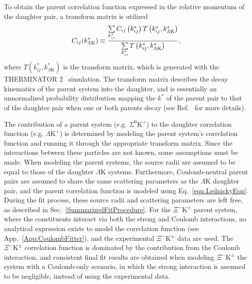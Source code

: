 \documentclass[ALICE,manyauthors]{cernphprep}
\newcommand{\kstar}{$k^{*}$\xspace}
\newcommand{\KchP}{$\mathrm{K^{+}}$\xspace}
\newcommand{\LamK}{$\Lambda$K\xspace}
\newcommand{\LamKchP}{$\Lambda\mathrm{K^{+}}$\xspace}
\newcommand{\XiKpm}{$\Xi^{-}\mathrm{K^{\pm}}$\xspace}
\begin{document}
To obtain the parent correlation function expressed in the relative momentum of the daughter pair, a transform matrix is utilized{\color{blue}{,}}
\begin{equation}
  C_{ij}(k^{*}_{\Lambda\mathrm{K}}) \equiv \frac{\sum\limits_{k^{*}_{ij}} C_{ij}\left(k^{*}_{ij}\right) T\left(k^{*}_{ij},k^{*}_{\Lambda\mathrm{K}}\right)}{\sum\limits_{k^{*}_{ij}} T\left(k^{*}_{ij},k^{*}_{\Lambda\mathrm{K}}\right)}{\color{blue}{,}}
\label{eqn:ResidualsTransform}
\end{equation}
where $T(k^{*}_{ij},k^{*}_{\Lambda\mathrm{K}})$ is the transform matrix, which is generated with the THERMINATOR 2~\cite{Chojnacki:2011hb} simulation. 
The transform matrix describes the decay kinematics of the parent system into the daughter, and is essentially an unnormalized probability distribution mapping the \kstar of the parent pair to that of the daughter pair when one or both parents decay (see Ref.~\cite{Kisiel:2014mma} for more details).

The contribution of a parent system (e.g.{\color{blue}{,}} $\Sigma^{0}$\KchP) to the daughter correlation function (e.g.{\color{blue}{,}} \LamKchP) is determined by modeling the parent system's correlation function and running it through the appropriate transform matrix.
Since the interactions between these particles are not known, some assumptions must be made.
When modeling the parent systems, the source radii are assumed to be equal to those of the daughter \LamK systems.
Furthermore, Coulomb-neutral parent pairs are assumed to share the same scattering parameters as the \LamK daughter pair, and the parent correlation function is modeled using Eq.~\ref{eqn:LednickyEqn}.
During the fit process, these source radii and scattering parameters are left free, as described in Sec.~\ref{SummarizedFitProcedure}.
For the \XiKpm parent system, where the constituents interact via both the strong and Coulomb interactions, no analytical expression exists to model the correlation function (see App.~\ref{App:CoulombFitter}), and the experimental \XiKpm data are used.
The \XiKpm correlation function is dominated by the contribution from the Coulomb interaction, and consistent final fit results are obtained when modeling \XiKpm the system with a Coulomb-only scenario, in which the strong interaction is assumed to be negligible, instead of using the experimental data.
\end{document}
